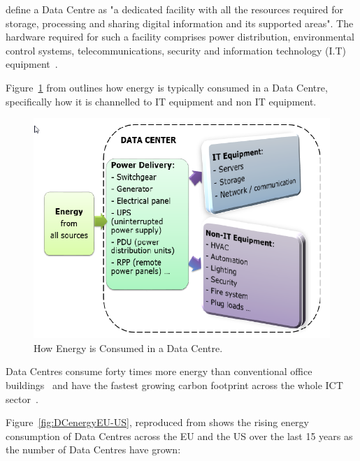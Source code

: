 \documentclass[12pt]{scrartcl}
\begin{document}
\citet{edsdoj.99f37e7899fb4fcaabdaa81e395626c420180101} define a Data Centre as "a dedicated facility with all the resources required for storage, processing and sharing digital information and its supported areas".  The hardware required for such a facility comprises power distribution, environmental control systems, telecommunications, security and information technology (I.T) equipment~\citep{edsdoj.99f37e7899fb4fcaabdaa81e395626c420180101}. 

Figure~\ref{fig:DCenergy} from \citep{edsdoj.99f37e7899fb4fcaabdaa81e395626c420180101} outlines how energy is typically consumed in a Data Centre, specifically how it is channelled to IT equipment and non IT equipment.

\begin{figure}[h]
  \caption{How Energy is Consumed in a Data Centre.}
  \label{fig:DCenergy}
  \centering
    \includegraphics[scale=0.35]{Data_center_energy}
\end{figure}


Data Centres consume forty times more energy than conventional office buildings~\citep{edsdoj.99f37e7899fb4fcaabdaa81e395626c420180101} and have the fastest growing carbon footprint across the whole ICT sector~\citep{edsbas.13818AC20170101}.

Figure~\ref{fig:DCenergyEU-US}, reproduced from \citet{edsbas.13818AC20170101} shows the rising energy consumption of Data Centres across the EU and the US over the last 15 years as the number of Data Centres have grown:
\end{document}
